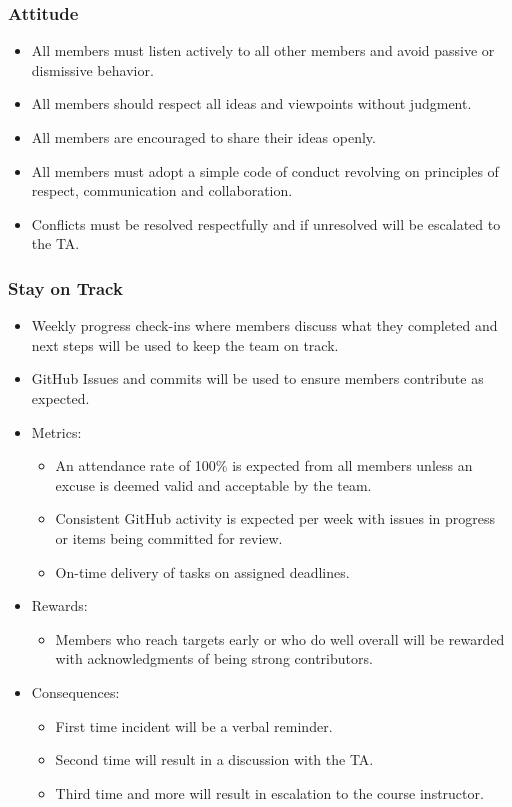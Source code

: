 \documentclass{article}
\begin{document}
\subsubsection*{Attitude}
\begin{itemize}
    \item All members must listen actively to all other members and avoid passive or dismissive behavior.
    \item All members should respect all ideas and viewpoints without judgment.
    \item All members are encouraged to share their ideas openly.
    \item All members must adopt a simple code of conduct revolving on principles of respect, communication and collaboration.
    \item Conflicts must be resolved respectfully and if unresolved will be escalated to the TA.
\end{itemize}

\subsubsection*{Stay on Track}
\begin{itemize}
    \item Weekly progress check-ins where members discuss what they completed and next steps will be used to keep the team on track. 
    \item GitHub Issues and commits will be used to ensure members contribute as expected.
    
    \item Metrics: \begin{itemize}
        \item An attendance rate of 100\% is expected from all members unless an excuse is deemed valid and acceptable by the team.
        \item Consistent GitHub activity is expected per week with issues in progress or items being committed for review.
        \item On-time delivery of tasks on assigned deadlines.
    \end{itemize}
    \item Rewards: \begin{itemize}
        \item Members who reach targets early or who do well overall will be rewarded with acknowledgments of being strong contributors. \end{itemize}
    \item Consequences: \begin{itemize}
        \item First time incident will be a verbal reminder.
        \item Second time will result in a discussion with the TA.
        \item Third time and more will result in escalation to the course instructor.
    \end{itemize}
\end{itemize}
\end{document}
